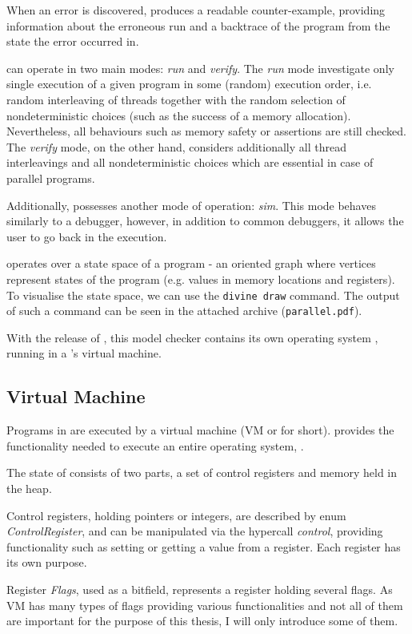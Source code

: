 When an error is discovered, \divine produces a readable counter-example, providing information about the erroneous run and a backtrace of the program from the state the error occurred in.

\divine can operate in two main modes: \textit{run} and \textit{verify}. The \textit{run} mode investigate only single execution of a given program in some (random) execution order, i.e. random interleaving of threads together with the random selection of nondeterministic choices (such as the success of a memory allocation). Nevertheless, all behaviours such as memory safety or assertions are still checked. The \textit{verify} mode, on the other hand, considers additionally all thread interleavings and all nondeterministic choices which are essential in case of parallel programs.

Additionally, \divine possesses another mode of operation: \textit{sim}. This mode behaves similarly to a debugger, however, in addition to common debuggers, it allows the user to go back in the execution.

\divine operates over a state space of a program - an oriented graph where vertices represent states of the program (e.g. values in memory locations and registers). To visualise the state space, we can use the \texttt{divine draw} command. The output of such a command can be seen in the attached archive (\texttt{parallel.pdf}).

With the release of , this model checker contains its own operating system \dios, running in a \divine's virtual machine.


\subsection{Virtual Machine} \label{sec:divine:vm}

Programs in \divine are executed by a virtual machine (\divine VM or \divm for short).  \divm provides the functionality needed to execute an entire operating system, \dios.

The state of \divm consists of two parts, a set of control registers and memory held in the heap. 

Control registers, holding pointers or integers, are described by enum \textit{ControlRegister}, and can be manipulated via the hypercall \textit{control}, providing functionality such as setting or getting a value from a register. Each register has its own purpose.     

Register \textit{Flags}, used as a bitfield, represents a register holding several flags. As VM has many types of flags providing various functionalities and not all of them are important for the purpose of this thesis, I will only introduce some of them.


